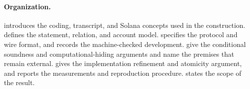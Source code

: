 \paragraph{Organization.}
 introduces the coding, transcript, and Solana concepts
used in the construction.   defines the statement, relation,
and account model.   specifies the protocol and wire
format, and  records the machine-checked development.
 give the conditional soundness and
computational-hiding arguments and name the premises that remain external.
 gives the implementation refinement and atomicity
argument, and  reports the measurements and reproduction
procedure.   states the scope of the result.
